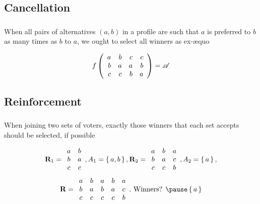 \documentclass[french, english]{beamer}
\begin{document}
\subsection{Cancellation}
\begin{frame}
	\frametitle{\subsecname}
	\begin{definition}[Cancellation]
		When all pairs of alternatives $(a, b)$ in a profile are such that $a$ is preferred to $b$ as many times as $b$ to $a$, we ought to select all winners as ex-æquo
	\end{definition}
	\begin{example}
		\begin{equation}
			f\left(%
			\begin{array}{rrrr}
				a&b&c&c\\
				b&a&a&b\\
				c&c&b&a\\
			\end{array}\right) = \allalts
		\end{equation}
	\end{example}
\end{frame}

\subsection{Reinforcement}
\begin{frame}
	\frametitle{\subsecname}
	\begin{definition}[\subsecname]
		When joining two sets of voters, exactly those winners that each set accepts should be selected, if possible
	\end{definition}
	\begin{example}
		\begin{equation}
			\mathbf{R}_1 =
			\begin{array}{cc}
				a&b\\
				b&a\\
				c&c\\
			\end{array},
			A_1 = \set{a, b},
			\mathbf{R}_2 =
			\begin{array}{ccc}
				a&b&a\\
				b&a&c\\
				c&c&b\\
			\end{array},
			A_2 = \set{a},
		\end{equation}
		\begin{equation}
			\prof =
			\begin{array}{ccccc}
				a&b&a&b&a\\
				b&a&b&a&c\\
				c&c&c&c&b\\
			\end{array}.
			\text{ Winners? }
			\pause
			\set{a}
		\end{equation}
	\end{example}
\end{frame}
\end{document}
